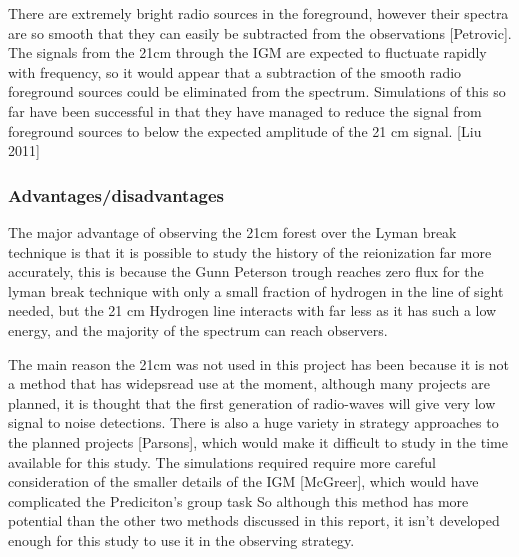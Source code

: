 There are extremely bright radio sources in the foreground, however their spectra are so smooth that they can easily be subtracted from the observations [Petrovic]. The signals from the 21cm through the IGM are expected to fluctuate rapidly with frequency, so it would appear that a subtraction of the smooth radio foreground sources could be eliminated from the spectrum. Simulations of this so far have been successful in that they have managed to reduce the signal from foreground sources to below the expected amplitude of the 21 cm signal. [Liu 2011]


         \subsubsection{Advantages/disadvantages} %
	\label{subsub:Advantages_disadvantages_21cm}
The major advantage of observing the 21cm forest over the Lyman break technique is that it is possible to study the history of the reionization far more accurately, this is because the Gunn Peterson trough reaches zero flux for the lyman break technique with only a small fraction of hydrogen in the line of sight needed, but the 21 cm Hydrogen line interacts with far less as it has such a low energy, and the majority of the spectrum can reach observers. 

The main reason the 21cm was not used in this project has been because it is not a method that has widepsread use at the moment, although many projects are planned, it is thought that the first generation of radio-waves will give very low signal to noise detections. There is also a huge variety in strategy approaches to the planned projects [Parsons], which would make it difficult to study in the time available for this study. The simulations required require more careful consideration of the smaller details of the IGM [McGreer], which would have complicated the Prediciton's group task  So although this method has more potential than the other two methods discussed in this report, it isn't developed enough for this study to use it in the observing strategy. 

    
